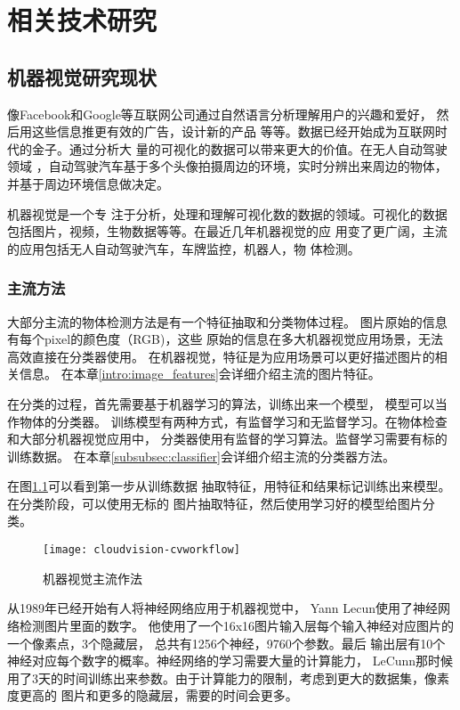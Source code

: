\chapter{相关技术研究}
\label{sec:current_state}

\section{机器视觉研究现状}
\label{subsec:cv_background}
像Facebook和Google等互联网公司通过自然语言分析理解用户的兴趣和爱好，
然后用这些信息推更有效的广告，设计新的产品
等等。数据已经开始成为互联网时代的金子。通过分析大
量的可视化的数据可以带来更大的价值。在无人自动驾驶领域
，自动驾驶汽车基于多个头像拍摄周边的环境，实时分辨出来周边的物体，并基于周边环境信息做决定。

机器视觉是一个专
注于分析，处理和理解可视化数的数据的领域。可视化的数据
包括图片，视频，生物数据等等。在最近几年机器视觉的应
用变了更广阔，主流的应用包括无人自动驾驶汽车，车牌监控，机器人，物
体检测。


\subsection{主流方法}
大部分主流的物体检测方法是有一个特征抽取和分类物体过程。\cite{juan2009comparison}
图片原始的信息有每个pixel的颜色度（RGB)，这些
原始的信息在多大机器视觉应用场景，无法高效直接在分类器使用。
在机器视觉，特征是为应用场景可以更好描述图片的相关信息。
在本章\ref{intro:image_features}会详细介绍主流的图片特征。

在分类的过程，首先需要基于机器学习的算法，训练出来一个模型，
模型可以当作物体的分类器。
训练模型有两种方式，有监督学习和无监督学习。在物体检查和大部分机器视觉应用中，
分类器使用有监督的学习算法。监督学习需要有标的训练数据。
在本章\ref{subsubsec:classifier}会详细介绍主流的分类器方法。

在图\ref{fig:cloudvision-cvworkflow}可以看到第一步从训练数据
抽取特征，用特征和结果标记训练出来模型。在分类阶段，可以使用无标的
图片抽取特征，然后使用学习好的模型给图片分类。
\begin{figure}[h]
  \centering
    \texttt{[image: cloudvision-cvworkflow]}
  \caption{机器视觉主流作法}
  \label{fig:cloudvision-cvworkflow}
\end{figure}

从1989年已经开始有人将神经网络应用于机器视觉中，
Yann Lecun使用了神经网络检测图片里面的数字。\cite{lecun1989backpropagation}
他使用了一个16x16图片输入层每个输入神经对应图片的一个像素点，3个隐藏层，
总共有1256个神经，9760个参数。最后
输出层有10个神经对应每个数字的概率。神经网络的学习需要大量的计算能力，
LeCunn那时候用了3天的时间训练出来参数。由于计算能力的限制，考虑到更大的数据集，像素度更高的
图片和更多的隐藏层，需要的时间会更多。

